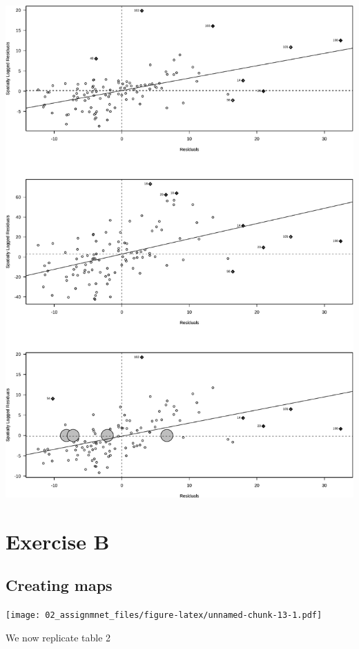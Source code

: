 \documentclass[
  a4paper,
]{article}
\begin{document}
\begin{center}\includegraphics{02_assignmnet_files/figure-latex/unnamed-chunk-11-1} \end{center}

\hypertarget{exercise-b}{%
\section{Exercise B}\label{exercise-b}}

\hypertarget{creating-maps}{%
\subsection{Creating maps}\label{creating-maps}}

\texttt{[image: 02\_assignmnet\_files/figure-latex/unnamed-chunk-13-1.pdf]}

We now replicate table 2
\end{document}
